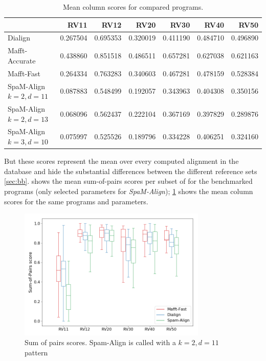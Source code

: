 \begin{table}[h]
	\centering
	\begin{tabular}{lrrrrrr}
		\toprule
		{} &      RV11 &      RV12 &      RV20 &      RV30 &      RV40 &      RV50 \\
		\midrule
		Dialign             &  0.267504 &  0.695353 &  0.320019 &  0.411190 &  0.484710 &  0.496890 \\
		Mafft-Accurate      &  0.438860 &  0.851518 &  0.486511 &  0.657281 &  0.627038 &  0.621163 \\
		Mafft-Fast          &  0.264334 &  0.763283 &  0.340603 &  0.467281 &  0.478159 &  0.528384 \\
		SpaM-Align $k=2, d=11$ &  0.087883 &  0.548499 &  0.192057 &  0.343963 &  0.404308 &  0.350156 \\
		SpaM-Align $k=2, d=13$ &  0.068096 &  0.562437 &  0.222104 &  0.367169 &  0.397829 &  0.289876 \\
		SpaM-Align $k=3, d=10$ &  0.075997 &  0.525526 &  0.189796 &  0.334228 &  0.406251 &  0.324160 \\
		\bottomrule
	\end{tabular}
	\caption{Mean column scores for compared programs.}
	\label{tab:cs-scores}
\end{table}

But these scores represent the mean over every computed alignment in the \bb database and hide the substantial differences between the different reference sets \ref{sec:bb}.
 shows the mean sum-of-pairs scores per subset of \bb for the benchmarked programs (only selected parameters for \textit{SpaM-Align}); \cref{tab:cs-scores} shows the mean column scores for the same programs and parameters.

\begin{figure}[h]
	\centering
	\includegraphics[width=0.8\textwidth]{../alignment-evaluation/sop-boxplot.png}
	\caption{Sum of pairs scores. Spam-Align is called with a $k = 2, d = 11$ pattern}
	\label{fig:sop-boxplot}
\end{figure}

